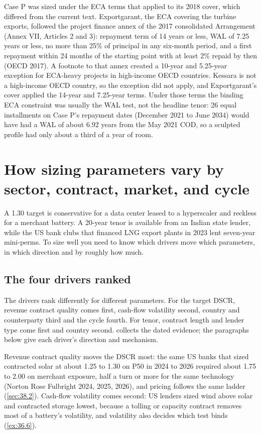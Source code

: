 Case P was sized under the ECA terms that applied to its 2018 cover, which differed from the current text. Exportgarant, the ECA covering the turbine exports, followed the project finance annex of the 2017 consolidated Arrangement (Annex VII, Articles 2 and 3): repayment term of 14 years or less, WAL of 7.25 years or less, no more than 25\% of principal in any six-month period, and a first repayment within 24 months of the starting point with at least 2\% repaid by then (OECD 2017). A footnote to that annex created a 10-year and 5.25-year exception for ECA-heavy projects in high-income OECD countries. Kessara is not a high-income OECD country, so the exception did not apply, and Exportgarant's cover applied the 14-year and 7.25-year terms. Under those terms the binding ECA constraint was usually the WAL test, not the headline tenor: 26 equal installments on Case P's repayment dates (December 2021 to June 2034) would have had a WAL of about 6.92 years from the May 2021 COD, so a sculpted profile had only about a third of a year of room.

\section{How sizing parameters vary by sector, contract, market, and cycle}\label{sec:36.10}

A 1.30\x{} target is conservative for a data center leased to a hyperscaler and reckless for a merchant battery. A 20-year tenor is available from an Indian state lender, while the US bank clubs that financed LNG export plants in 2023 lent seven-year mini-perms. To size well you need to know which drivers move which parameters, in which direction and by roughly how much.

\subsection{The four drivers ranked}\label{ssec:36.10.1}

The drivers rank differently for different parameters. For the target DSCR, revenue contract quality comes first, cash-flow volatility second, country and counterparty third and the cycle fourth. For tenor, contract length and lender type come first and country second.  collects the dated evidence; the paragraphs below give each driver's direction and mechanism.

Revenue contract quality moves the DSCR most: the same US banks that sized contracted solar at about 1.25\x{} to 1.30\x{} on P50 in 2024 to 2026 required about 1.75\x{} to 2.00\x{} on merchant exposure, half a turn or more for the same technology (Norton Rose Fulbright 2024, 2025, 2026), and pricing follows the same ladder (\cref{sec:38.2}). Cash-flow volatility comes second: US lenders sized wind above solar and contracted storage lowest, because a tolling or capacity contract removes most of a battery's volatility, and volatility also decides which test binds (\cref{ex:36.6}).


